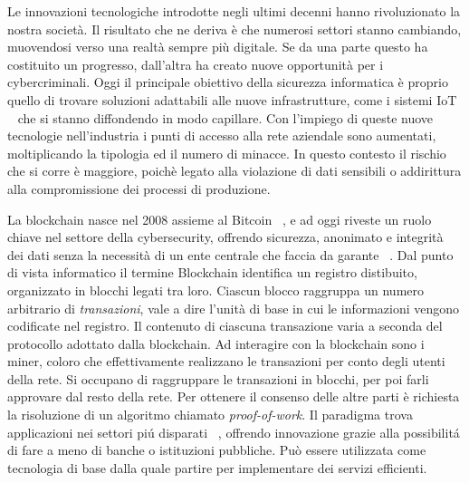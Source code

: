 

Le innovazioni tecnologiche introdotte negli ultimi decenni hanno rivoluzionato la nostra società. Il risultato che ne deriva è che numerosi settori stanno cambiando, muovendosi verso una realtà sempre più digitale. Se da una parte questo ha costituito un progresso, dall'altra ha creato nuove opportunità per i cybercriminali.\newline
\indent Oggi il principale obiettivo della sicurezza informatica è proprio quello di trovare soluzioni adattabili alle nuove infrastrutture, come i sistemi IoT ~\cite{KHAN2018395} che si stanno diffondendo in modo capillare. Con l'impiego di queste nuove tecnologie nell'industria i punti di accesso alla rete aziendale sono aumentati, moltiplicando la tipologia ed il numero di minacce. In questo contesto il rischio che si corre è maggiore, poichè legato alla violazione di dati sensibili o addirittura alla compromissione dei processi di produzione.\newline

La blockchain nasce nel 2008 assieme al Bitcoin ~\cite{nakamoto2008bitcoin}, e ad oggi riveste un ruolo chiave nel settore della cybersecurity, offrendo sicurezza, anonimato e integrità dei dati senza la necessità di un ente centrale che faccia da garante ~\cite{dai2017bitcoin}.\newline
\indent Dal punto di vista informatico il termine Blockchain identifica un registro distibuito, organizzato in blocchi legati tra loro. Ciascun blocco raggruppa un numero arbitrario di \textit{transazioni}, vale a dire l'unità di base in cui le informazioni vengono codificate nel registro. Il contenuto di ciascuna transazione varia a seconda del protocollo adottato dalla blockchain. Ad interagire con la blockchain sono i miner, coloro che effettivamente realizzano le transazioni per conto degli utenti della rete. Si occupano di raggruppare le transazioni in blocchi, per poi farli approvare dal resto della rete. Per ottenere il consenso delle altre parti è richiesta la risoluzione di un algoritmo chiamato \textit{proof-of-work}.\newline
\indent Il paradigma trova applicazioni nei settori piú disparati ~\cite{iansiti_lakhani_2017}, offrendo innovazione grazie alla possibilitá di fare a meno di banche o istituzioni pubbliche. Può essere utilizzata come tecnologia di base dalla quale partire per implementare dei servizi efficienti.\newline

